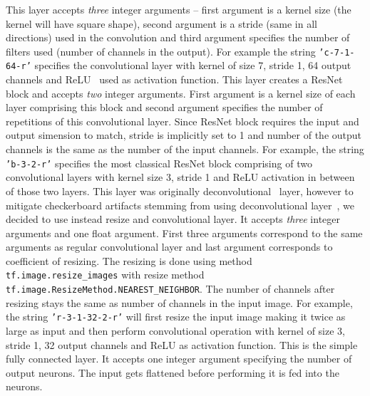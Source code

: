 \begin{description}
 This layer accepts {\em three} integer arguments -- first argument is a kernel size (the kernel will have square shape), second argument is a stride (same in all directions) used in the convolution and third argument specifies the number of filters used (number of channels in the output). For example the string \texttt{'c-7-1-64-r'} specifies the convolutional layer with kernel of size 7, stride 1, 64 output channels and ReLU~\cite{relu} used as activation function.
 This layer creates a ResNet block and accepts {\em two} integer arguments. First argument is a kernel size of each layer comprising this block and second argument specifies the number of repetitions of this convolutional layer. Since ResNet block requires the input and output simension to match, stride is implicitly set to 1 and number of the output channels is the same as the number of the input channels. For example, the string \texttt{'b-3-2-r'} specifies the most classical ResNet block comprising of two convolutional layers with kernel size 3, stride 1 and ReLU activation in between of those two layers.
 This layer was originally deconvolutional~\cite{deconv} layer, however to mitigate checkerboard artifacts stemming from using deconvolutional layer~\cite{resizeconv}, we decided to use instead resize and convolutional layer. It accepts {\em three} integer arguments and one float argument. First three arguments correspond to the same arguments as regular convolutional layer and last argument corresponds to coefficient of resizing. The resizing is done using method \texttt{tf.image.resize\_images} with resize method \texttt{tf.image.ResizeMethod.NEAREST\_NEIGHBOR}. The number of channels after resizing stays the same as number of channels in the input image. For example, the string \texttt{'r-3-1-32-2-r'} will first resize the input image making it twice as large as input and then perform convolutional operation with kernel of size 3, stride 1, 32 output channels and ReLU as activation function.
 This is the simple fully connected layer. It accepts one integer argument specifying the number of output neurons. The input gets flattened before performing it is fed into the neurons.
\end{description}

